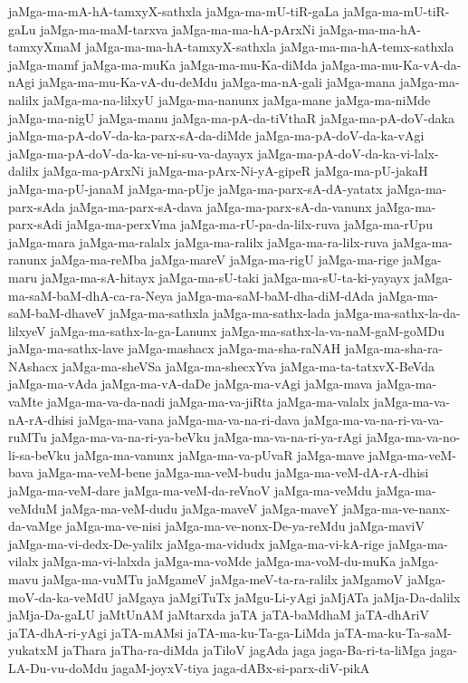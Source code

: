 {jaMga-ma-mA-hA-tamxyX-sathxla
jaMga-ma-mU-tiR-gaLa
jaMga-ma-mU-tiR-gaLu
jaMga-ma-maM-tarxva
jaMga-ma-ma-hA-pArxNi
jaMga-ma-ma-hA-tamxyXmaM
jaMga-ma-ma-hA-tamxyX-sathxla
jaMga-ma-ma-hA-temx-sathxla
jaMga-mamf
jaMga-ma-muKa
jaMga-ma-mu-Ka-diMda
jaMga-ma-mu-Ka-vA-da-nAgi
jaMga-ma-mu-Ka-vA-du-deMdu
jaMga-ma-nA-gali
jaMga-mana
jaMga-ma-nalilx
jaMga-ma-na-lilxyU
jaMga-ma-nanunx
jaMga-mane
jaMga-ma-niMde
jaMga-ma-nigU
jaMga-manu
jaMga-ma-pA-da-tiVthaR
jaMga-ma-pA-doV-daka
jaMga-ma-pA-doV-da-ka-parx-sA-da-diMde
jaMga-ma-pA-doV-da-ka-vAgi
jaMga-ma-pA-doV-da-ka-ve-ni-su-va-dayayx
jaMga-ma-pA-doV-da-ka-vi-lalx-dalilx
jaMga-ma-pArxNi
jaMga-ma-pArx-Ni-yA-gipeR
jaMga-ma-pU-jakaH
jaMga-ma-pU-janaM
jaMga-ma-pUje
jaMga-ma-parx-sA-dA-yatatx
jaMga-ma-parx-sAda
jaMga-ma-parx-sA-dava
jaMga-ma-parx-sA-da-vanunx
jaMga-ma-parx-sAdi
jaMga-ma-perxVma
jaMga-ma-rU-pa-da-lilx-ruva
jaMga-ma-rUpu
jaMga-mara
jaMga-ma-ralalx
jaMga-ma-ralilx
jaMga-ma-ra-lilx-ruva
jaMga-ma-ranunx
jaMga-ma-reMba
jaMga-mareV
jaMga-ma-rigU
jaMga-ma-rige
jaMga-maru
jaMga-ma-sA-hitayx
jaMga-ma-sU-taki
jaMga-ma-sU-ta-ki-yayayx
jaMga-ma-saM-baM-dhA-ca-ra-Neya
jaMga-ma-saM-baM-dha-diM-dAda
jaMga-ma-saM-baM-dhaveV
jaMga-ma-sathxla
jaMga-ma-sathx-lada
jaMga-ma-sathx-la-da-lilxyeV
jaMga-ma-sathx-la-ga-Lanunx
jaMga-ma-sathx-la-va-naM-gaM-goMDu
jaMga-ma-sathx-lave
jaMga-mashacx
jaMga-ma-sha-raNAH
jaMga-ma-sha-ra-NAshacx
jaMga-ma-sheVSa
jaMga-ma-shecxYva
jaMga-ma-ta-tatxvX-BeVda
jaMga-ma-vAda
jaMga-ma-vA-daDe
jaMga-ma-vAgi
jaMga-mava
jaMga-ma-vaMte
jaMga-ma-va-da-nadi
jaMga-ma-va-jiRta
jaMga-ma-valalx
jaMga-ma-va-nA-rA-dhisi
jaMga-ma-vana
jaMga-ma-va-na-ri-dava
jaMga-ma-va-na-ri-va-va-ruMTu
jaMga-ma-va-na-ri-ya-beVku
jaMga-ma-va-na-ri-ya-rAgi
jaMga-ma-va-no-li-sa-beVku
jaMga-ma-vanunx
jaMga-ma-va-pUvaR
jaMga-mave
jaMga-ma-veM-bava
jaMga-ma-veM-bene
jaMga-ma-veM-budu
jaMga-ma-veM-dA-rA-dhisi
jaMga-ma-veM-dare
jaMga-ma-veM-da-reVnoV
jaMga-ma-veMdu
jaMga-ma-veMduM
jaMga-ma-veM-dudu
jaMga-maveV
jaMga-maveY
jaMga-ma-ve-nanx-da-vaMge
jaMga-ma-ve-nisi
jaMga-ma-ve-nonx-De-ya-reMdu
jaMga-maviV
jaMga-ma-vi-dedx-De-yalilx
jaMga-ma-vidudx
jaMga-ma-vi-kA-rige
jaMga-ma-vilalx
jaMga-ma-vi-lalxda
jaMga-ma-voMde
jaMga-ma-voM-du-muKa
jaMga-mavu
jaMga-ma-vuMTu
jaMgameV
jaMga-meV-ta-ra-ralilx
jaMgamoV
jaMga-moV-da-ka-veMdU
jaMgaya
jaMgiTuTx
jaMgu-Li-yAgi
jaMjATa
jaMja-Da-dalilx
jaMja-Da-gaLU
jaMtUnAM
jaMtarxda
jaTA
jaTA-baMdhaM
jaTA-dhAriV
jaTA-dhA-ri-yAgi
jaTA-mAMsi
jaTA-ma-ku-Ta-ga-LiMda
jaTA-ma-ku-Ta-saM-yukatxM
jaThara
jaTha-ra-diMda
jaTiloV
jagAda
jaga
jaga-Ba-ri-ta-liMga
jaga-LA-Du-vu-doMdu
jagaM-joyxV-tiya
jaga-dABx-si-parx-diV-pikA
}
